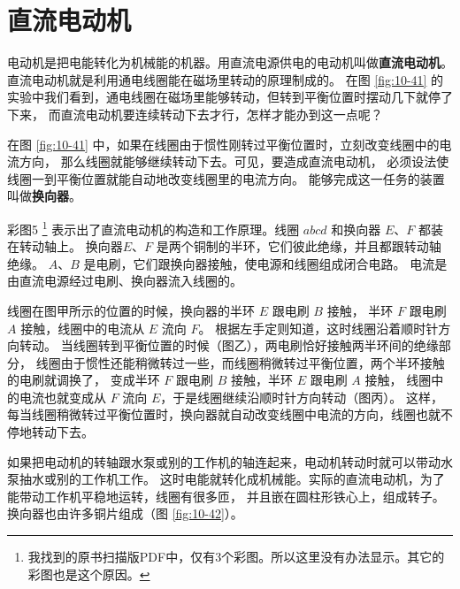 \section{直流电动机}\label{sec:10-10}

电动机是把电能转化为机械能的机器。用直流电源\footnotemark 供电的电动机叫做\textbf{直流电动机}。
直流电动机就是利用通电线圈能在磁场里转动的原理制成的。
在图 \ref{fig:10-41} 的实验中我们看到，通电线圈在磁场里能够转动，但转到平衡位置时摆动几下就停了下来，
而直流电动机要连续转动下去才行，怎样才能办到这一点呢？

在图 \ref{fig:10-41} 中，如果在线圈由于惯性刚转过平衡位置时，立刻改变线圈中的电流方向，
那么线圈就能够继续转动下去。可见，要造成直流电动机，
必须设法使线圈一到平衡位置就能自动地改变线圈里的电流方向。
能够完成这一任务的装置叫做\textbf{换向器}。

彩图5 \footnote{我找到的原书扫描版PDF中，仅有3个彩图。所以这里没有办法显示。其它的彩图也是这个原因。}
表示出了直流电动机的构造和工作原理。线圈 $abcd$ 和换向器 $E$、$F$ 都装在转动轴上。
换向器$E$、$F$ 是两个铜制的半环，它们彼此绝缘，并且都跟转动轴绝缘。
$A$、$B$ 是电刷，它们跟换向器接触，使电源和线圈组成闭合电路。
电流是由直流电源经过电刷、换向器流入线圈的。

线圈在图甲所示的位置的时候，换向器的半环 $E$ 跟电刷 $B$ 接触，
半环 $F$ 跟电刷 $A$ 接触，线圈中的电流从 $E$ 流向 $F$。
根据左手定则知道，这时线圈沿着顺时针方向转动。
当线圈转到平衡位置的时候（图乙），两电刷恰好接触两半环间的绝缘部分，
线圈由于惯性还能稍微转过一些，而线圈稍微转过平衡位置，两个半环接触的电刷就调换了，
变成半环 $F$ 跟电刷 $B$ 接触，半环 $E$ 跟电刷 $A$ 接触，
线圈中的电流也就变成从 $F$ 流向 $E$，于是线圈继续沿顺时针方向转动（图丙）。
这样，每当线圈稍微转过平衡位置时，换向器就自动改变线圈中电流的方向，线圈也就不停地转动下去。

如果把电动机的转轴跟水泵或别的工作机的轴连起来，电动机转动时就可以带动水泵抽水或别的工作机工作。
这时电能就转化成机械能。实际的直流电动机，为了能带动工作机平稳地运转，线圈有很多匝，
并且嵌在圆柱形铁心上，组成转子。换向器也由许多铜片组成（图 \ref{fig:10-42}）。

